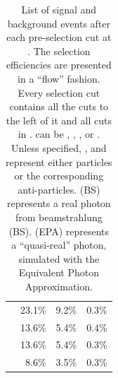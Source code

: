 \begin{table}[!tbp]
\begin{tabular}{lrrr}
\hline
\gammagamma{\Pphoton}{\BS}{\Pphoton}{\BS}{ \Pquark \Pquark \Pquark \Pquark}& 23.1\% & 9.2\%  & 0.3\%\\
\gammagamma{\Pphoton}{\BS}{\Pphoton}{\EPA}{ \Pquark \Pquark \Pquark \Pquark}& 13.6\% & 5.4\%  &0.4\%\\
\gammagamma{\Pphoton}{\EPA}{\Pphoton}{\BS}{ \Pquark \Pquark \Pquark \Pquark}& 13.6\% & 5.4\% & 0.3\%\\
\gammagamma{\Pphoton}{\EPA}{\Pphoton}{\EPA}{ \Pquark \Pquark \Pquark \Pquark}& 8.6\% & 3.5\% & 0.3\% \\
\hline \hline
\end{tabular}
\caption[List of signal and background samples after pre-selection cuts at .]
{List of signal and background events after each pre-selection cut at .  The selection efficiencies are presented in a ``flow'' fashion. Every selection cut contains all the cuts to the left of it and all  cuts in . \Pquark can be \Pup, \Pdown, \Pstrange, \Pbottom or \Ptop. Unless specified, \Pquark, \Plepton and \Pnu represent either particles or the corresponding anti-particles. \Pphoton(BS) represents a real photon from beamstrahlung (BS). \Pphoton(EPA) represents a ``quasi-real'' photon, simulated with the Equivalent Photon Approximation.}
\label{tab:doubleHiggsPreslectionPart2}
\end{table}

